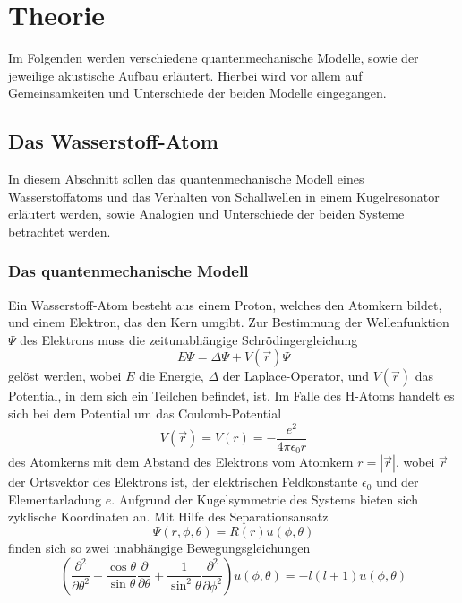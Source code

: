 \section{Theorie}
Im Folgenden werden verschiedene quantenmechanische Modelle, sowie der jeweilige akustische Aufbau erläutert. Hierbei wird vor allem auf Gemeinsamkeiten und Unterschiede der beiden Modelle eingegangen.

\subsection{Das Wasserstoff-Atom}
In diesem Abschnitt sollen das quantenmechanische Modell eines Wasserstoffatoms und das Verhalten von Schallwellen in einem Kugelresonator erläutert werden, sowie Analogien und Unterschiede der beiden Systeme betrachtet werden.
\subsubsection{Das quantenmechanische Modell}
Ein Wasserstoff-Atom besteht aus einem Proton, welches den Atomkern bildet, und einem Elektron, das den Kern umgibt. Zur Bestimmung der Wellenfunktion $\Psi$ des Elektrons muss die zeitunabhängige Schrödingergleichung
\begin{equation*}
  E \Psi = \Delta \Psi + V \left( \vec{r} \right) \Psi
\end{equation*}
gelöst werden, wobei $E$ die Energie, $\Delta$ der Laplace-Operator, und $V \left( \vec{r} \right)$ das Potential, in dem sich ein Teilchen befindet, ist. Im Falle des H-Atoms handelt es sich bei dem Potential um das Coulomb-Potential
\begin{equation*}
  V \left( \vec{r} \right) = V \left( r \right) = - \frac{e^2}{4\pi \epsilon_0 r}
\end{equation*}
des Atomkerns mit dem Abstand des Elektrons vom Atomkern $r = |\vec{r}|$, wobei $\vec{r}$ der Ortsvektor des Elektrons ist, der elektrischen Feldkonstante $\epsilon_0$ und der Elementarladung $e$.
Aufgrund der Kugelsymmetrie des Systems bieten sich zyklische Koordinaten an. Mit Hilfe des Separationsansatz
\begin{equation*}
  \Psi \left( r, \phi, \theta \right) = R\left( r \right) u \left( \phi, \theta \right)
\end{equation*}
finden sich so zwei unabhängige Bewegungsgleichungen
\begin{equation*}
  \left( \frac{\partial^2}{\partial \theta^2} + \frac{\cos \theta}{\sin \theta} \frac{\partial}{\partial \theta} + \frac{1}{\sin^2 \theta} \frac{\partial^2}{\partial \phi^2} \right) u \left( \phi, \theta \right) = -l \left( l + 1 \right) u \left( \phi, \theta \right)
\end{equation*}
